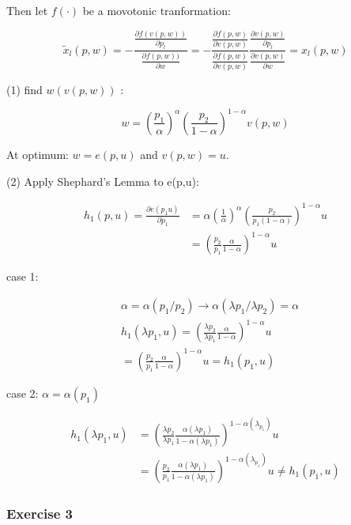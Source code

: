 {{\begin{enumerate}[label=(\alph*)]
{Then let $f(\cdot)$ be a movotonic tranformation:

$$
\tilde{x}_{l}(p, w)=-\frac{\frac{\partial f(v(p, w))}{\partial p_{l}}}{\frac{\partial f(p, w))}{\partial w}}=-\frac{\frac{\partial f(p, w)}{\partial v(p, w)}}{\frac{\partial f(p, w)}{\partial v(p, w)}} \frac{\frac{\partial v(p, w)}{\partial p_{l}}}{\frac{\partial v(p, w)}{\partial w}}=x_{l}(p, w)
$$
}
{\item 
(1) find $w(v(p, w))$ :

$$
w=\left(\frac{p_{1}}{\alpha}\right)^{\alpha}\left(\frac{p_{2}}{1-\alpha}\right)^{1-\alpha} v(p, w)
$$

At optimum: $w=e(p, u)$ and $v(p, w)=u$.

(2) Apply Shephard's Lemma to e(p,u):

$$
\begin{aligned}
h_{1}(p, u)=\frac{\partial e\left(p_{1} u\right)}{\partial p_{1}} & =\alpha\left(\frac{1}{\alpha}\right)^{\alpha}\left(\frac{p_{2}}{p_{1}(1-\alpha)}\right)^{1-\alpha} u \\
& =\left(\frac{p_{2}}{p_{1}} \frac{\alpha}{1-\alpha}\right)^{1-\alpha} u
\end{aligned}
$$
}
{\item 
case 1:

$$
\begin{aligned}
& \alpha=\alpha\left(p_1 / p_{2}\right) \longrightarrow \alpha\left(\lambda p_{1} / \lambda p_{2}\right)=\alpha \\
& h_{1}\left(\lambda p_{1}, u\right)=\left(\frac{\lambda p_{2}}{\lambda p_{1}} \frac{\alpha}{1-\alpha}\right)^{1-\alpha} u \\
& =\left(\frac{p_{2}}{p_{1}} \frac{\alpha}{1-\alpha}\right)^{1-\alpha} u=h_{1} (p_{1}, u)
\end{aligned}
$$

case 2: $\alpha=\alpha\left(p_{1}\right)$

$$
\begin{aligned}
h_{1}(\lambda p_1, u) & =\left(\frac{\lambda p_{2}}{\lambda p_{1}} \frac{\alpha\left(\lambda {p_{1}}\right)}{1-\alpha \left(\lambda p_{1}\right)}\right)^{1-\alpha\left(\lambda_{p_{1}}\right)} u \\
& =\left(\frac{p_{2}}{p_{1}} \frac{\alpha\left(\lambda p_{1}\right)}{1-\alpha\left(\lambda {p_{1}}\right)}\right)^{1-\alpha\left(\lambda_{p_{1}}\right)} u \neq h_{1}\left(p_{1} , u\right)
\end{aligned}
$$
}
\end{enumerate}
}
{
\subsubsection*{Exercise 3}

}}
